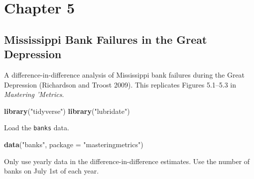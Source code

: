 \documentclass[]{book}
\newenvironment{Shaded}{\begin{snugshade}}{\end{snugshade}}
\newcommand{\KeywordTok}[1]{\textcolor[rgb]{0.13,0.29,0.53}{\textbf{#1}}}
\newcommand{\DataTypeTok}[1]{\textcolor[rgb]{0.13,0.29,0.53}{#1}}
\newcommand{\StringTok}[1]{\textcolor[rgb]{0.31,0.60,0.02}{#1}}
\newcommand{\OperatorTok}[1]{\textcolor[rgb]{0.81,0.36,0.00}{\textbf{#1}}}
\newcommand{\NormalTok}[1]{#1}
\theoremstyle{definition}
\theoremstyle{definition}
\theoremstyle{definition}
\theoremstyle{remark}
\begin{document}
\part{Chapter 5}\label{part-chapter-5}

\chapter{Mississippi Bank Failures in the Great
Depression}\label{mississippi-bank-failures-in-the-great-depression}

A difference-in-difference analysis of Mississippi bank failures during
the Great Depression (Richardson and Troost 2009). This replicates
Figures 5.1--5.3 in \emph{Mastering 'Metrics}.

\begin{Shaded}
\begin{Highlighting}[]
\KeywordTok{library}\NormalTok{(}\StringTok{"tidyverse"}\NormalTok{)}
\KeywordTok{library}\NormalTok{(}\StringTok{"lubridate"}\NormalTok{)}
\end{Highlighting}
\end{Shaded}

Load the \texttt{banks} data.

\begin{Shaded}
\begin{Highlighting}[]
\KeywordTok{data}\NormalTok{(}\StringTok{"banks"}\NormalTok{, }\DataTypeTok{package =} \StringTok{"masteringmetrics"}\NormalTok{)}
\end{Highlighting}
\end{Shaded}

Only use yearly data in the difference-in-difference estimates. Use the
number of banks on July 1st of each year.

\begin{Shaded}
\end{Shaded}
\end{document}
